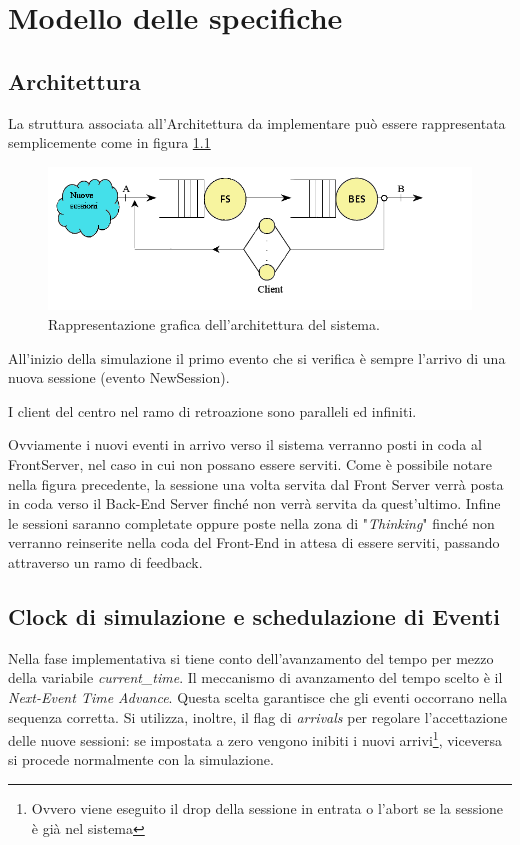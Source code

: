 \chapter{Modello delle specifiche}
	\label{cap:modellospecifiche}

\section{Architettura}
La struttura associata all'Architettura da implementare può essere rappresentata semplicemente come in figura \ref{fig:architettura}
\begin{figure}[H]
	\centering
	\includegraphics[scale=0.7]{img/architettura.png}
	\caption[Architettura del sistema]{Rappresentazione grafica dell'architettura del sistema.}
	\label{fig:architettura}
	\end{figure}
All’inizio della simulazione il primo evento che si verifica è sempre l'arrivo di una nuova sessione (evento NewSession).

\vspace{0.5cm}I client del centro nel ramo di retroazione sono paralleli ed infiniti.

\vspace{0.5cm}Ovviamente i nuovi eventi in arrivo verso il sistema verranno posti in coda al FrontServer, nel caso in cui non possano essere serviti. Come è possibile notare nella figura precedente, la sessione una volta servita dal Front Server verrà posta in coda verso il Back-End Server finché non verrà servita da quest'ultimo. Infine le sessioni saranno completate oppure poste nella zona di "\textit{Thinking}" finché non verranno reinserite nella coda del Front-End in attesa di essere serviti, passando attraverso un ramo di feedback.
 
\section{Clock di simulazione e schedulazione di  Eventi}
Nella fase implementativa si tiene conto dell'avanzamento del tempo per mezzo della variabile \textit{current\_time}. Il meccanismo di avanzamento del tempo scelto è il \textit{Next-Event Time Advance}. Questa scelta garantisce che gli eventi occorrano nella sequenza corretta. Si utilizza, inoltre, il flag di \textit{arrivals} per regolare l'accettazione delle nuove sessioni: se impostata a zero vengono inibiti i nuovi arrivi\footnote{Ovvero viene eseguito il drop della sessione in entrata o l'abort se la sessione è già nel sistema}, viceversa si procede normalmente con la simulazione.

